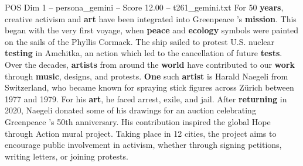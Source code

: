 \begin{textsample}{POS Dim 1 – persona\_gemini – Score 12.00 – t261\_gemini.txt}  \label{ex:f1_pos_050}
For 50 \textbf{years}, creative activism and \textbf{art} have been integrated into Greenpeace 's \textbf{mission}.
This began with the very first voyage, when \textbf{peace} and \textbf{ecology} symbols were painted on the sails of the Phyllis Cormack.
The ship sailed to protest U.S. nuclear \textbf{testing} in Amchitka, an action which led to the cancellation of future \textbf{tests}.
Over the decades, \textbf{artists} from around the \textbf{world} have contributed to our \textbf{work} through \textbf{music}, designs, and protests. \textbf{One} such \textbf{artist} is Harald Naegeli from Switzerland, who became known for spraying stick figures across Zürich between 1977 and 1979.
For his \textbf{art}, he faced arrest, exile, and jail.
After \textbf{returning} in 2020, Naegeli donated some of his drawings for an auction celebrating Greenpeace 's 50th anniversary.
His contribution inspired the global Hope through Action mural project.
Taking place in 12 cities, the project aims to encourage public involvement in activism, whether through signing petitions, writing letters, or joining protests.

\end{textsample}
